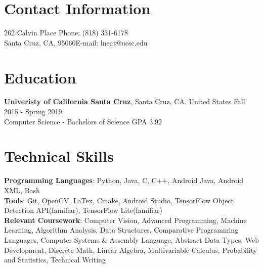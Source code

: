 \documentclass[mm,line]{res}
\begin{document}
 \hfill 

\begin{resume}
\section{\sc Contact Information}

\vspace{.05in}
  262 Calvin Place \hfill         {Phone:}  (818) 331-6178 \\
  Santa Cruz, CA, 95060\hfill {E-mail:}  lneat@ucsc.edu\\
 

\section{\sc Education}
{\bf Univeristy of California Santa Cruz}, Santa Cruz, CA. United States \hfill Fall 2015 - Spring 2019\\
Computer Science - Bachelors of Science \hfill GPA 3.92\\


\section{\sc Technical Skills}
{\bf Programming Languages}: Python, Java, C, C++, Android Java, Android XML, Bash \vspace{2mm} \\ 
{\bf Tools}: Git, OpenCV, LaTex, Cmake, Android Studio, TensorFlow Object Detection API(familiar), TensorFlow Lite(familiar) \vspace{2mm}   \\
{\bf Relevant Coursework}: Computer Vision, Advanced Programming, Machine Learning, Algorithm Analysis, Data Structures, Comparative Programming Languages, Computer Systems \& Assembly Language, Abstract Data Types, Web Development, Discrete Math, Linear Algebra,  Multivariable Calculus, Probability and Statistics, Technical Writing \\

\end{resume}
\end{document}
